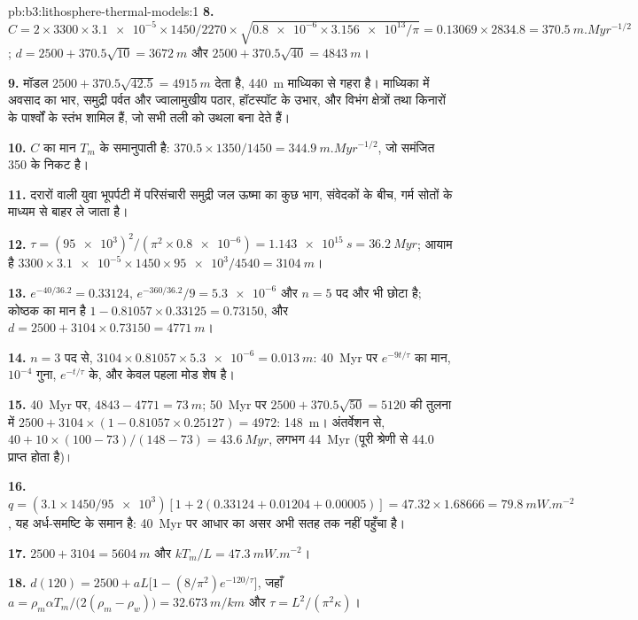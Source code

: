 \begin{solution}{pb:b3:lithosphere-thermal-models:1}
\textbf{8.} $C = 2\times3300\times\num{3.1e-5}\times1450/2270\times
\sqrt{\num{0.8e-6}\times\num{3.156e13}/\pi} = 0.13069\times2834.8 =
\qty{370.5}{m.Myr^{-1/2}}$; $d = 2500 + 370.5\sqrt{10} = \qty{3672}{m}$ और
$2500 + 370.5\sqrt{40} = \qty{4843}{m}$।

\textbf{9.} मॉडल $2500 + 370.5\sqrt{42.5} = \qty{4915}{m}$ देता है,
\qty{440}{m} माध्यिका से गहरा है। माध्यिका में अवसाद का भार,
समुद्री पर्वत और ज्वालामुखीय पठार, हॉटस्पॉट के उभार, और
विभंग क्षेत्रों तथा किनारों के पार्श्वों के स्तंभ शामिल हैं, जो सभी तली को
उथला बना देते हैं।

\textbf{10.} $C$ का मान $T_m$ के समानुपाती है: $370.5\times1350/1450 =
\qty{344.9}{m.Myr^{-1/2}}$, जो समंजित 350 के निकट है।

\textbf{11.} दरारों वाली युवा भूपर्पटी में परिसंचारी समुद्री जल ऊष्मा का
कुछ भाग, संवेदकों के बीच, गर्म सोतों के माध्यम से बाहर ले जाता है।

\textbf{12.} $\tau = (\num{95e3})^2/(\pi^2\times\num{0.8e-6}) =
\qty{1.143e15}{s} = \qty{36.2}{Myr}$; आयाम है $3300\times
\num{3.1e-5}\times1450\times\num{95e3}/4540 = \qty{3104}{m}$।

\textbf{13.} $e^{-40/36.2} = 0.33124$, $e^{-360/36.2}/9 = \num{5.3e-6}$ और
$n = 5$ पद और भी छोटा है; कोष्ठक का मान है $1 - 0.81057\times0.33125 =
0.73150$, और $d = 2500 + 3104\times0.73150 = \qty{4771}{m}$।

\textbf{14.} $n = 3$ पद से, $3104\times0.81057\times\num{5.3e-6} =
\qty{0.013}{m}$: \qty{40}{Myr} पर $e^{-9t/\tau}$ का मान, $10^{-4}$ गुना,
$e^{-t/\tau}$ के, और केवल पहला मोड शेष है।

\textbf{15.} \qty{40}{Myr} पर, $4843 - 4771 = \qty{73}{m}$;
\qty{50}{Myr} पर $2500 + 370.5\sqrt{50} = 5120$ की तुलना में $2500 + 3104\times(1 -
0.81057\times0.25127) = 4972$: \qty{148}{m}। अंतर्वेशन से, $40 + 10\times
(100 - 73)/(148 - 73) = \qty{43.6}{Myr}$, लगभग \qty{44}{Myr} (पूरी श्रेणी
से 44.0 प्राप्त होता है)।

\textbf{16.} $q = (3.1\times1450/\num{95e3})[1 + 2(0.33124 + 0.01204 +
0.00005)] = 47.32\times1.68666 = \qty{79.8}{mW.m^{-2}}$, यह अर्ध-समष्टि के
समान है: \qty{40}{Myr} पर आधार का असर अभी
सतह तक नहीं पहुँचा है।

\textbf{17.} $2500 + 3104 = \qty{5604}{m}$ और $kT_m/L = \qty{47.3}{mW.m^{-2}}$।

\textbf{18.} $d(120) = 2500 + aL\bigl[1 - (8/\pi^2)e^{-120/\tau}\bigr]$, जहाँ
$a = \rho_m\alpha T_m/\bigl(2(\rho_m - \rho_w)\bigr) = \qty{32.673}{m/km}$ और
$\tau = L^2/(\pi^2\kappa)$।


\end{solution}
